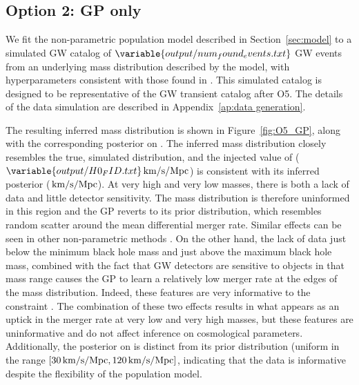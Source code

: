 \documentclass[]{aastex631}
\begin{document}
\subsection{Option 2: GP only}
We fit the non-parametric population model described in Section~\ref{sec:model} to a simulated \ac{GW} catalog of $\variable{output/num_found_events.txt}$ \ac{GW} events from an underlying mass distribution described by the \plp{} model, with hyperparameters consistent with those found in \citet{abbott_population_2023}.
This simulated catalog is designed to be representative of the \ac{GW}  transient catalog after \ac{O5}.
The details of the data simulation are described in Appendix~\ref{ap:data generation}.

The resulting inferred mass distribution is shown in Figure~\ref{fig:O5_GP}, along with the corresponding posterior on \Ho.
The inferred mass distribution closely resembles the true, simulated distribution, and the injected value of \Ho{} ($\variable{output/H0_FID.txt}\Hunits$) is consistent with its inferred posterior ($\,\text{km/s/Mpc}$).
At very high and very low masses, there is both a lack of data and little detector sensitivity.
The mass distribution is therefore uninformed in this region and the \ac{GP} reverts to its prior distribution, which resembles random scatter around the mean differential merger rate.
Similar effects can be seen in other non-parametric methods \citep{edelman_cover_2023, callister_parameter-free_2023}.
On the other hand, the lack of data just below the minimum black hole mass and just above the maximum black hole mass, combined with the fact that \ac{GW} detectors are sensitive to objects in that mass range causes the GP to learn a relatively low merger rate at the edges of the mass distribution.
Indeed, these features are very informative to the \Ho{} constraint \citep{gwtc3_cosmo}.
The combination of these two effects results in what appears as an uptick in the merger rate at very low and very high masses, but these features are uninformative and do not affect inference on cosmological parameters.
Additionally, the posterior on \Ho{} is distinct from its prior distribution (uniform in the range $[30\,\text{km/s/Mpc},120\,\text{km/s/Mpc}]$, indicating that the data is informative despite the flexibility of the population model.
\end{document}
